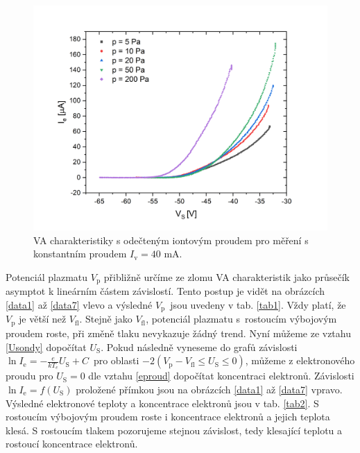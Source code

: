 \documentclass[a4paper,12pt]{article}
\begin{document}
\begin{figure}[h!]
	\centering
	\includegraphics[width=135mm]{odectene34567.png}
	\caption{VA charakteristiky s odečteným iontovým proudem pro měření s konstantním proudem $I_\text{v} = 40$ \si{\milli\ampere}.}
	\label{odectene34567}
\end{figure}

\newpage
Potenciál plazmatu $V_\text{p}$ přibližně určíme ze zlomu VA charakteristik jako průsečík asymptot k lineárním částem závislostí. Tento
postup je vidět na obrázcích \ref{data1} až \ref{data7} vlevo a výsledné $V_\text{p}$~jsou uvedeny v tab. \ref{tab1}. Vždy platí, že
$V_\text{p}$ je větší než $V_\text{fl}$. Stejně jako $V_\text{fl}$, potenciál plazmatu s~rostoucím výbojovým proudem roste, při změně
tlaku nevykazuje žádný trend. Nyní můžeme ze vztahu \eqref{Usondy} dopočítat $U_\text{S}$. Pokud následně vyneseme do grafů závislosti $\ln
I_{\text{e}}=-\frac{e}{kT_e}U_\text{S}+C$~pro oblasti $-2(V_\text{p} - V_\text{{fl}} \leq U_\text{S} \leq 0)$, můžeme z
elektronového proudu pro $U_\text{S} = 0$ dle vztahu \eqref{eproud} dopočítat koncentraci elektronů. Závislosti $\ln I_{\text{e}} =
f(U_\text{S})$ proložené přímkou jsou na obrázcích \ref{data1} až \ref{data7} vpravo. Výsledné elektronové teploty a koncentrace
elektronů jsou v tab. \ref{tab2}. S rostoucím výbojovým proudem roste i koncentrace elektronů a jejich teplota klesá. S rostoucím
tlakem pozorujeme stejnou závislost, tedy klesající teplotu a rostoucí koncentrace elektronů.
\end{document}
